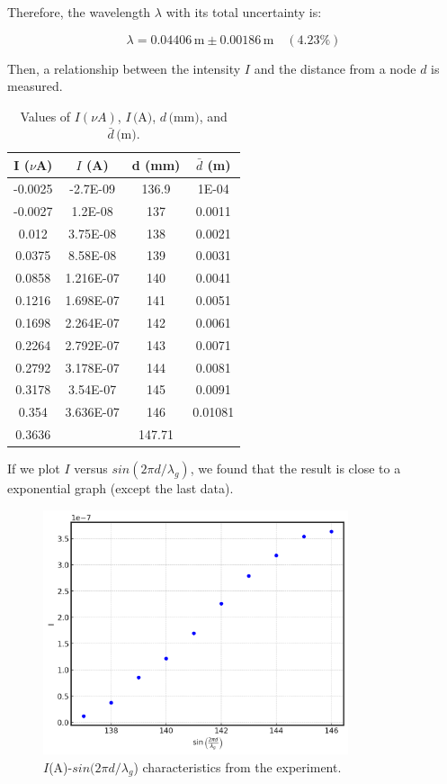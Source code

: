 \documentclass{article}
\begin{document}
Therefore, the wavelength \( \lambda \) with its total uncertainty is:

\[
\lambda = 0.04406 \, \text{m} \pm 0.00186 \, \text{m} \quad (4.23\%)
\]

Then, a relationship between the intensity $I$ and the distance from a node $d$ is measured. 

\begin{table}[H]
    \centering
    \begin{tabular}{|c|c|c|c|}
        \hline
        I ($\nu$A) & \( I \) (A) & d (mm) & \( \bar{d} \) (m) \\
        \hline
        -0.0025 & -2.7E-09 & 136.9 & 1E-04 \\
        -0.0027 & 1.2E-08 & 137 & 0.0011 \\
        0.012 & 3.75E-08 & 138 & 0.0021 \\
        0.0375 & 8.58E-08 & 139 & 0.0031 \\
        0.0858 & 1.216E-07 & 140 & 0.0041 \\
        0.1216 & 1.698E-07 & 141 & 0.0051 \\
        0.1698 & 2.264E-07 & 142 & 0.0061 \\
        0.2264 & 2.792E-07 & 143 & 0.0071 \\
        0.2792 & 3.178E-07 & 144 & 0.0081 \\
        0.3178 & 3.54E-07 & 145 & 0.0091 \\
        0.354 & 3.636E-07 & 146 & 0.01081 \\
        0.3636 & & 147.71 & \\
        \hline
    \end{tabular}
    \caption{Values of \( I (\nu A) \), \( I \, \text{(A)} \), \( d \, \text{(mm)} \), and \( \bar{d} \, \text{(m)} \).}
\end{table}

If we plot $I$ versus $sin(2\pi d/\lambda_g)$, we found that the result is close to a exponential graph (except the last data).

\begin{figure}[H]
    \centering
    \includegraphics[width=0.8\textwidth]{./media/lab1 raw I-V.png}
    \caption{ $I$(A)-$sin(2\pi d/\lambda_g$) characteristics from the experiment.}
    \label{fig:raw_iv}
\end{figure}
\end{document}

